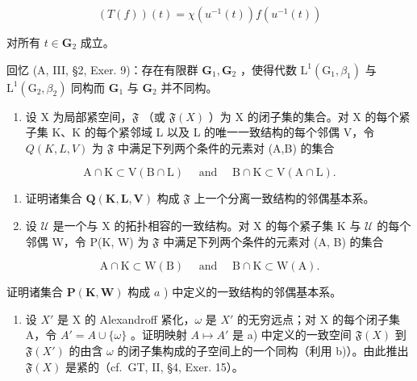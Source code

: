 \[
(T (f)) (t) = \chi (u ^ {- 1} (t)) f (u ^ {- 1} (t))
\]

对所有 \(t \in \mathbf{G}_2\) 成立。

回忆 (A, III, §2, Exer. 9)：存在有限群 \(\mathbf{G}_1, \mathbf{G}_2\) ，使得代数 \(\mathrm{L}^1(\mathrm{G}_1, \beta_1)\) 与 \(\mathrm{L}^1(\mathrm{G}_2, \beta_2)\) 同构而 \(\mathbf{G}_1\) 与 \(\mathbf{G}_2\) 并不同构。

\exercisesection{}

\begin{enumerate}
\def\labelenumi{\arabic{enumi})}
\tightlist
\item
  设 X 为局部紧空间，\(\mathfrak{F}\) （或 \(\mathfrak{F}(X)\) ）为 X 的闭子集的集合。对 X 的每个紧子集 K、K 的每个紧邻域 L 以及 L 的唯一一致结构的每个邻偶 V，令 \(Q(K,L,V)\) 为 \(\mathfrak{F}\) 中满足下列两个条件的元素对 (A,B) 的集合
\end{enumerate}

\[
\mathrm{A} \cap \mathrm{K} \subset \mathrm{V} (\mathrm{B} \cap \mathrm{L}) \quad \text { and } \quad \mathrm{B} \cap \mathrm{K} \subset \mathrm{V} (\mathrm{A} \cap \mathrm{L}).
\]

\begin{enumerate}
\def\labelenumi{\alph{enumi})}
\item
  证明诸集合 \(\mathbf{Q}(\mathbf{K},\mathbf{L},\mathbf{V})\) 构成 \(\mathfrak{F}\) 上一个分离一致结构的邻偶基本系。
\item
  设 \(\mathcal{U}\) 是一个与 X 的拓扑相容的一致结构。对 X 的每个紧子集 K 与 \(\mathcal{U}\) 的每个邻偶 W，令 P(K, W) 为 \(\mathfrak{F}\) 中满足下列两个条件的元素对 (A, B) 的集合
\end{enumerate}

\[
\mathrm{A} \cap \mathrm{K} \subset \mathrm{W} (\mathrm{B}) \quad \text { and } \quad \mathrm{B} \cap \mathrm{K} \subset \mathrm{W} (\mathrm{A}).
\]

证明诸集合 \(\mathbf{P}(\mathbf{K},\mathbf{W})\) 构成 \(a\) ) 中定义的一致结构的邻偶基本系。

\begin{enumerate}
\def\labelenumi{\alph{enumi})}
\setcounter{enumi}{2}
\tightlist
\item
  设 \(X'\) 是 X 的 Alexandroff 紧化，\(\omega\) 是 \(X'\) 的无穷远点；对 X 的每个闭子集 A，令 \(A' = A \cup \{\omega\}\) 。证明映射 \(A \mapsto A'\) 是 a) 中定义的一致空间 \(\mathfrak{F}(X)\) 到 \(\mathfrak{F}(X')\) 的由含 \(\omega\) 的闭子集构成的子空间上的一个同构（利用 b)）。由此推出 \(\mathfrak{F}(X)\) 是紧的（cf.~GT, II, §4, Exer. 15）。
\end{enumerate}

